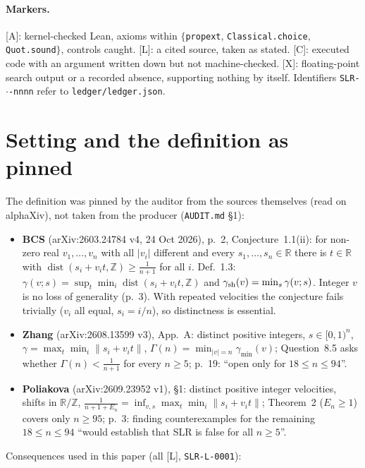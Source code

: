 \documentclass[10pt]{article}
\newcommand{\tier}[1]{\textsf{[#1]}}
\newcommand{\tA}{\tier{A}}
\newcommand{\tL}{\tier{L}}
\newcommand{\tC}{\tier{C}}
\newcommand{\tX}{\tier{X}}
\newcommand{\lean}[1]{\texttt{#1}}
\newcommand{\R}{\mathbb{R}}
\newcommand{\Z}{\mathbb{Z}}
\newcommand{\dist}{\operatorname{dist}}
\begin{document}
\paragraph{Markers.} \tA{}: kernel-checked Lean, axioms within $\{$\lean{propext}, \lean{Classical.choice}, \lean{Quot.sound}$\}$, controls caught. \tL{}: a cited source, taken as stated. \tC{}: executed code with an argument written down but not machine-checked. \tX{}: floating-point search output or a recorded absence, supporting nothing by itself. Identifiers \texttt{SLR-$\cdot$-nnnn} refer to \texttt{ledger/ledger.json}.

\section{Setting and the definition as pinned}\label{sec:setting}
The definition was pinned by the auditor from the sources themselves (read on alphaXiv), not taken from the producer (\texttt{AUDIT.md} \S1):
\begin{itemize}\itemsep=0pt
\item \textbf{BCS} \cite{bcs} (arXiv:2603.24784 v4, 24 Oct 2026), p.~2, Conjecture~1.1(ii): for non-zero real $v_1,\dots,v_n$ with all $|v_i|$ different and every $s_1,\dots,s_n\in\R$ there is $t\in\R$ with $\dist(s_i+v_it,\Z)\ge\frac1{n+1}$ for all $i$. Def.~1.3: $\gamma(v;s)=\sup_t\min_i\dist(s_i+v_it,\Z)$ and $\gamma_{\rm sh}(v)=\min_{s}\gamma(v;s)$. Integer $v$ is no loss of generality (p.~3). With repeated velocities the conjecture fails trivially ($v_i$ all equal, $s_i=i/n$), so distinctness is essential.
\item \textbf{Zhang} \cite{zhang} (arXiv:2608.13599 v3), App.~A: distinct positive integers, $s\in[0,1)^n$, $\gamma=\max_t\min_i\|s_i+v_it\|$, $\Gamma(n)=\min_{|v|=n}\gamma_{\min}(v)$; Question~8.5 asks whether $\Gamma(n)<\frac1{n+1}$ for every $n\ge5$; p.~19: ``open only for $18\le n\le94$''.
\item \textbf{Poliakova} \cite{pol} (arXiv:2609.23952 v1), \S1: distinct positive integer velocities, shifts in $\R/\Z$, $\frac1{n+1+E_n}=\inf_{v,s}\max_t\min_i\|s_i+v_it\|$; Theorem~2 ($E_n\ge1$) covers only $n\ge95$; p.~3: finding counterexamples for the remaining $18\le n\le94$ ``would establish that SLR is false for all $n\ge5$''.
\end{itemize}
Consequences used in this paper (all \tL{}, \texttt{SLR-L-0001}):
\end{document}
